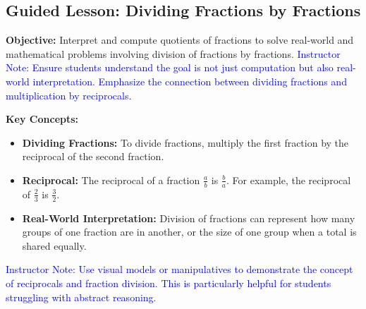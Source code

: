 \documentclass[12pt]{article}
\title{}
\date{}
\begin{document}
\subsection*{Guided Lesson: Dividing Fractions by Fractions}
\onehalfspacing

\begin{tcolorbox}[colframe=black!40, colback=gray!5, 
coltitle=black, colbacktitle=black!20, fonttitle=\bfseries\Large, 
title=Learning Objective, halign title=center, left=5pt, right=5pt, top=5pt, bottom=15pt]
\textbf{Objective:} Interpret and compute quotients of fractions to solve real-world and mathematical problems involving division of fractions by fractions.
\textcolor{blue}{Instructor Note: Ensure students understand the goal is not just computation but also real-world interpretation. Emphasize the connection between dividing fractions and multiplication by reciprocals.}
\end{tcolorbox}

\begin{tcolorbox}[colframe=black!60, colback=white, 
coltitle=black, colbacktitle=black!15, fonttitle=\bfseries\Large, 
title=Key Concepts and Vocabulary, halign title=center, left=10pt, right=10pt, top=10pt, bottom=15pt]
\textbf{Key Concepts:}
\begin{itemize}
    \item \textbf{Dividing Fractions:} To divide fractions, multiply the first fraction by the reciprocal of the second fraction.
    \item \textbf{Reciprocal:} The reciprocal of a fraction \( \frac{a}{b} \) is \( \frac{b}{a} \). For example, the reciprocal of \( \frac{2}{3} \) is \( \frac{3}{2} \).
    \item \textbf{Real-World Interpretation:} Division of fractions can represent how many groups of one fraction are in another, or the size of one group when a total is shared equally.
\end{itemize}
\textcolor{blue}{Instructor Note: Use visual models or manipulatives to demonstrate the concept of reciprocals and fraction division. This is particularly helpful for students struggling with abstract reasoning.}
\end{tcolorbox}

\vspace{1em}
\end{document}
